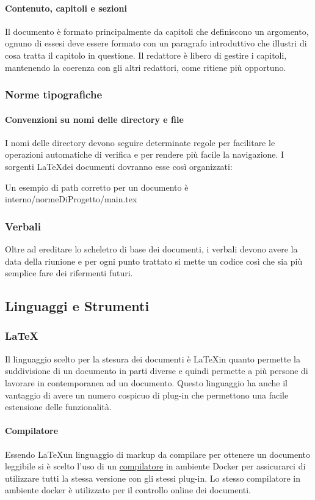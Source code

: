 \paragraph{Contenuto, capitoli e sezioni}
Il documento è formato principalmente da capitoli che definiscono un argomento,
ognuno di essesi deve essere formato con un paragrafo introduttivo che illustri
di cosa tratta il capitolo in questione.
Il redattore è libero di gestire i capitoli, mantenendo la coerenza con gli altri
redattori, come ritiene più opportuno.
\subsubsection{Norme tipografiche}
\paragraph{Convenzioni su nomi delle directory e file}
I nomi delle directory devono seguire determinate regole per facilitare le operazioni
automatiche di verifica e per rendere più facile la navigazione.
I sorgenti \LaTeX \space dei documenti dovranno esse così organizzati:


Un esempio di path corretto per un documento è interno/normeDiProgetto/main.tex
\subsubsection{Verbali}
Oltre ad ereditare lo scheletro di base dei documenti, i verbali devono avere la
data della riunione e per ogni punto trattato si mette un codice così che sia più
semplice fare dei rifermenti futuri.

\subsection{Linguaggi e Strumenti}
\subsubsection{\LaTeX}
Il linguaggio scelto per la stesura dei documenti è \LaTeX \space in quanto permette
la suddivisione di un documento in parti diverse e quindi permette a più persone
di lavorare in contemporanea ad un documento.
Questo linguaggio ha anche il vantaggio di avere un numero cospicuo di plug-in
che permettono una facile estensione delle funzionalità.

\paragraph{Compilatore}
Essendo \LaTeX \space un linguaggio di markup da compilare per ottenere un documento
leggibile si è scelto l'uso di un
\href{https://github.com/dante-ev/docker-texlive}{compilatore} in ambiente Docker\glo
per assicurarci di utilizzare tutti la stessa versione con gli stessi plug-in.
Lo stesso compilatore in ambiente docker è utilizzato per il controllo online dei
documenti.
